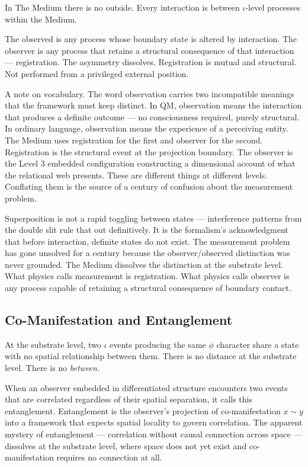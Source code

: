 \documentclass[11pt,letterpaper]{article}
\begin{document}
In The Medium there is no outside. Every interaction is between \(\iota\)-level processes within the Medium.

The observed is any process whose boundary state is altered by interaction. The observer is any process that retains a structural consequence of that interaction — registration. The asymmetry dissolves. Registration is mutual and structural. Not performed from a privileged external position.

A note on vocabulary. The word observation carries two incompatible meanings that the framework must keep distinct. In QM, observation means the interaction that produces a definite outcome — no consciousness required, purely structural. In ordinary language, observation means the experience of a perceiving entity. The Medium uses registration for the first and observer for the second. Registration is the structural event at the projection boundary. The observer is the Level 3 embedded configuration constructing a dimensional account of what the relational web presents. These are different things at different levels. Conflating them is the source of a century of confusion about the measurement problem.

Superposition is not a rapid toggling between states — interference patterns from the double slit rule that out definitively. It is the formalism's acknowledgment that before interaction, definite states do not exist. The measurement problem has gone unsolved for a century because the observer/observed distinction was never grounded. The Medium dissolves the distinction at the substrate level. What physics calls measurement is registration. What physics calls observer is any process capable of retaining a structural consequence of boundary contact.

\subsection{Co-Manifestation and Entanglement}
\label{sec:orga3be65f}

At the substrate level, two \(\iota\) events producing the same \(\phi\) character share a state with no spatial relationship between them. There is no distance at the substrate level. There is no \emph{between}.

When an observer embedded in differentiated structure encounters two events that are correlated regardless of their spatial separation, it calls this entanglement. Entanglement is the observer's projection of co-manifestation \(x \sim y\) into a framework that expects spatial locality to govern correlation. The apparent mystery of entanglement --- correlation without causal connection across space --- dissolves at the substrate level, where space does not yet exist and co-manifestation requires no connection at all.
\end{document}
